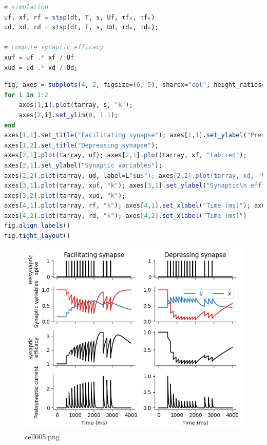 \begin{lstlisting}[language=julia]
# simulation
uf, xf, rf = stsp(dt, T, s, Uf, τfₓ, τfᵤ)
ud, xd, rd = stsp(dt, T, s, Ud, τdₓ, τdᵤ);

# compute synaptic efficacy
xuf = uf .* xf / Uf 
xud = ud .* xd / Ud; 
\end{lstlisting}
\begin{lstlisting}[language=julia]
fig, axes = subplots(4, 2, figsize=(6, 5), sharex="col", height_ratios=[1, 2, 2, 2])
for i in 1:2
    axes[1,i].plot(tarray, s, "k");
    axes[2,i].set_ylim(0, 1.1); 
end
axes[1,1].set_title("Facilitating synapse"); axes[1,1].set_ylabel("Presynaptic\n spike");
axes[1,2].set_title("Depressing synapse"); 
axes[2,1].plot(tarray, uf); axes[2,1].plot(tarray, xf, "tab:red"); 
axes[2,1].set_ylabel("Synaptic variables"); 
axes[2,2].plot(tarray, ud, label=L"$u$"); axes[2,2].plot(tarray, xd, "tab:red", label=L"$x$"); axes[2,2].legend(ncol=2)
axes[3,1].plot(tarray, xuf, "k"); axes[3,1].set_ylabel("Synaptic\n efficacy")
axes[3,2].plot(tarray, xud, "k"); 
axes[4,1].plot(tarray, rf, "k"); axes[4,1].set_xlabel("Time (ms)"); axes[4,1].set_ylabel("Postsynaptic current")
axes[4,2].plot(tarray, rd, "k"); axes[4,2].set_xlabel("Time (ms)")
fig.align_labels()
fig.tight_layout()
\end{lstlisting}
\begin{figure}[ht]
	\centering
	\includegraphics[scale=0.8, max width=\linewidth]{./fig/synapse-model/dynamical-synapses/cell005.png}
	\caption{cell005.png}
	\label{cell005.png}
\end{figure}
